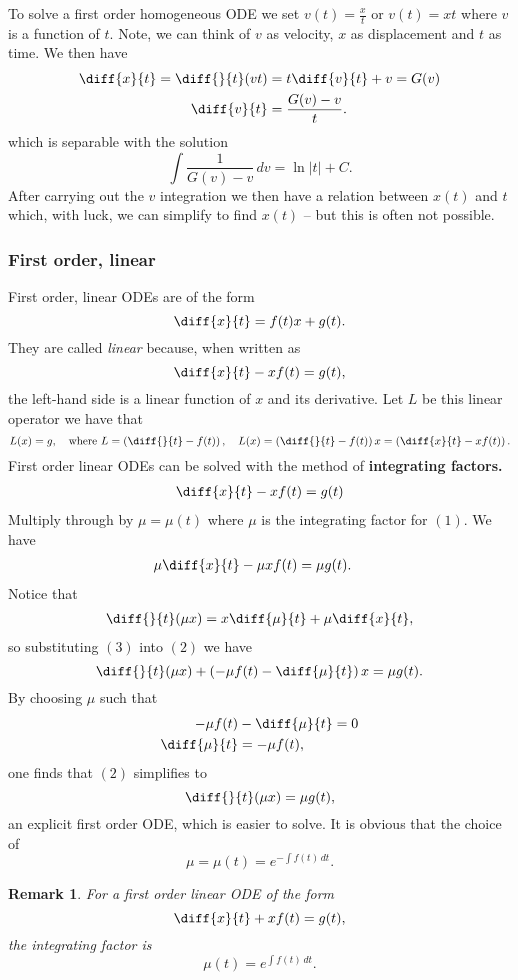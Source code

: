 \documentclass[12pt, a4paper]{article}
\newtheorem*{remark}{Remark}
\theoremstyle{definition}
\theoremstyle{plain}
\begin{document}
To solve a first order homogeneous ODE we set $v(t)=\frac{x}{t}$ or $v(t)=xt$ where $v$ is a function of $t.$ Note, we can think of $v$ as velocity, $x$ as displacement and $t$ as time. We then have $$
\begin{aligned} 
\diff{x}{t}=\diff{}{t}(vt)&=t\diff{v}{t}+v =G(v) \\
\diff{v}{t}&=\frac{G(v)-v}{t}.
\end{aligned}$$ which is separable with the solution $$\int \frac{1}{G(v)-v} \, dv = \ln|t|+C.$$ After carrying out the $v$ integration we then have a relation between $x(t)$ and $t$ which, with luck, we can simplify to find $x(t)$ -- but this is often not possible.

\subsubsection{First order, linear}

First order, linear ODEs are of the form $$\diff{x}{t} = f(t)x +g(t).$$ They are called \textit{linear} because, when written as $$\diff{x}{t}-xf(t)=g(t),$$ the left-hand side is a linear function of $x$ and its derivative. Let $L$ be this linear operator we have that $$L(x)=g, \quad \text{where } L=\left(\diff{}{t}-f(t)\right), \quad L(x)=\left(\diff{}{t}-f(t)\right)x=\left(\diff{x}{t}-xf(t)\right).$$ First order linear ODEs can be solved with the method of \textbf{integrating factors.} 
\begin{align} \diff{x}{t}-xf(t)=g(t) \end{align} Multiply through by $\mu =\mu(t)$ where $\mu$ is the integrating factor for $(1).$ We have \begin{align} \mu\diff{x}{t}-\mu xf(t)&=\mu g(t). \end{align} Notice that \begin{align} \diff{}{t}(\mu x) = x\diff{\mu}{t}+\mu\diff{x}{t}, \end{align} so substituting $(3)$ into $(2)$ we have $$\diff{}{t}(\mu x) + \left(-\mu f(t)-\diff{\mu}{t}\right)x=\mu g(t).$$ By choosing $\mu$ such that $$\begin{aligned} -\mu f(t)&-\diff{\mu}{t} =0  \\ \diff{\mu}{t} &= -\mu f(t), \end{aligned}$$ one finds that $(2)$ simplifies to $$\diff{}{t}(\mu x)=\mu g(t),$$ an explicit first order ODE, which is easier to solve. It is obvious that the choice of $$\mu=\mu(t)= e^{-\int f(t) \, dt}.$$

\begin{remark}
For a first order linear ODE of the form $$\diff{x}{t}+xf(t)=g(t),$$ the integrating factor is $$\mu(t)=e^{\int f(t) \, dt}.
$$
\end{remark}
\end{document}
